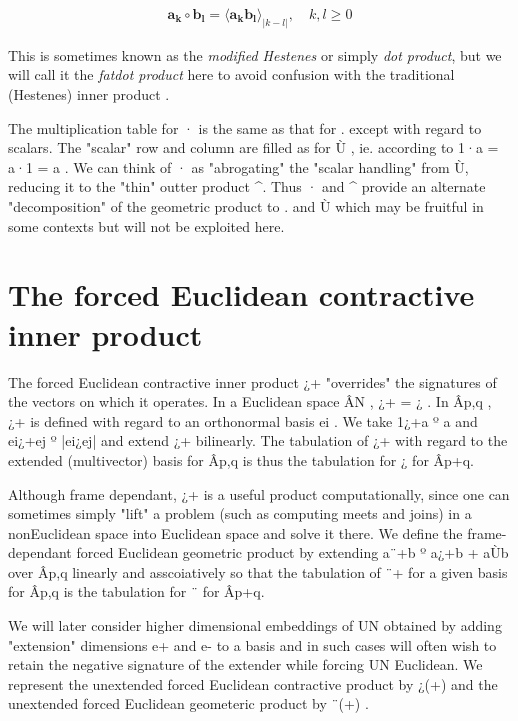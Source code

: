 \documentclass[a4paper]{book}
\numberwithin{equation}{chapter}
\begin{document}
\begin{align}
    \mathbf{a_k \circ b_l} = \langle \mathbf{a_k b_l} \rangle_{|k-l|}, \quad k,l\ge 0
\end{align}

This is sometimes known as the \emph{modified Hestenes} or simply
\emph{dot product}, but we will call it the \emph{fatdot product}
here to avoid confusion with the traditional (Hestenes) inner product .

\vspace{\baselineskip}

The multiplication table for · is the same as that for . except with regard to scalars. The "scalar" row and column are filled as for Ù , ie. according to 1·a  = a·1 = a    .
We can think of · as "abrogating" the "scalar handling" from Ù, reducing it to the "thin" outter product ^. Thus · and ^ provide an alternate "decomposition" of the geometric product to . and Ù which may be fruitful in some contexts but will not be exploited here.

    \section{The forced Euclidean contractive inner product}

The forced Euclidean contractive inner product ¿+ "overrides" the signatures of the vectors on which it operates. In a Euclidean space ÂN , ¿+ = ¿ .   In Âp,q , ¿+ is defined with regard to an orthonormal basis {ei} . We take 1¿+a º a and  ei¿+ej º |ei¿ej| and extend ¿+ bilinearly.
The tabulation of ¿+ with regard to the extended (multivector) basis for Âp,q is thus the tabulation for ¿ for Âp+q.

Although frame dependant, ¿+ is a useful product computationally, since one can sometimes simply "lift" a problem (such as computing meets and joins) in a nonEuclidean space into Euclidean space and solve it there.
We define the frame-dependant forced Euclidean geometric product by extending a¨+b º a¿+b + aÙb over Âp,q linearly and asscoiatively so that the tabulation of ¨+ for a given basis for Âp,q is the tabulation for ¨ for Âp+q.

We will later consider higher dimensional embeddings of UN obtained by adding "extension" dimensions e+ and e- to a basis and in such cases will often wish to retain the negative signature of the extender while forcing UN Euclidean. We represent the unextended forced Euclidean contractive product by ¿(+) and the unextended forced Euclidean geometeric product by ¨(+) . 
    
\end{document}
